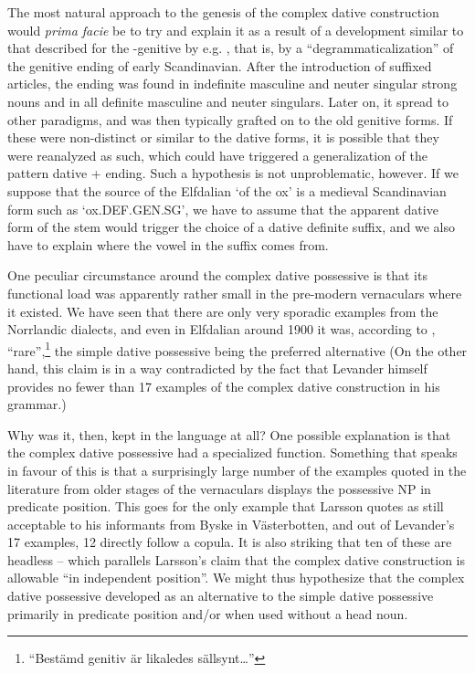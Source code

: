 The most natural approach to the genesis of the complex dative construction would \textit{prima facie} be to try and explain it as a result of a development similar to that described for the -genitive by e.g. \citet{Norde1997}, that is, by a “degrammaticalization” of the genitive ending of early Scandinavian. After the introduction of suffixed articles, the ending was found in indefinite masculine and neuter singular strong nouns and in all definite masculine and neuter singulars. Later on, it spread to other paradigms, and was then typically grafted on to the old genitive forms. If these were non-distinct or similar to the dative forms, it is possible that they were reanalyzed as such, which could have triggered a generalization of the pattern dative + ending. Such a hypothesis is not unproblematic, however. If we suppose that the source of the Elfdalian  ‘of the ox’ is a medieval Scandinavian form such as  ‘ox.DEF.GEN.SG’, we have to assume that the apparent dative form of the stem would trigger the choice of a dative definite suffix, and we also have to explain where the vowel in the suffix comes from. 


One peculiar circumstance around the complex dative possessive is that its functional load was apparently rather small in the pre-modern vernaculars where it existed. We have seen that there are only very sporadic examples from the Norrlandic dialects, and even in Elfdalian around 1900 it was, according to \citet[98-99]{Levander1909}, “rare”,\footnote{ “Bestämd genitiv är likaledes sällsynt…”} the simple dative possessive being the preferred alternative (On the other hand, this claim is in a way contradicted by the fact that Levander himself provides no fewer than 17 examples of the complex dative construction in his grammar.) 


Why was it, then, kept in the language at all? One possible explanation is that the complex dative possessive had a specialized function. Something that speaks in favour of this is that a surprisingly large number of the examples quoted in the literature from older stages of the vernaculars displays the possessive NP in predicate position. This goes for the only example that Larsson quotes as still acceptable to his informants from Byske in Västerbotten, and out of Levander’s 17 examples, 12 directly follow a copula. It is also striking that ten of these are headless – which parallels Larsson’s claim that the complex dative construction is allowable “in independent position”. We might thus hypothesize that the complex dative possessive developed as an alternative to the simple dative possessive primarily in predicate position and/or when used without a head noun. 

